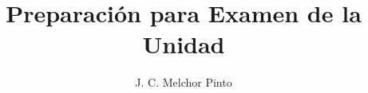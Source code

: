 \documentclass[12pt,addpoints]{repaso}
\title{Preparación para Examen de la Unidad}
\author{J. C. Melchor Pinto}
\begin{document}
\INFO%

\begin{multicols}{2}
    
    
\end{multicols}
\begin{questions}
    \question 
\end{questions}
\end{document}
